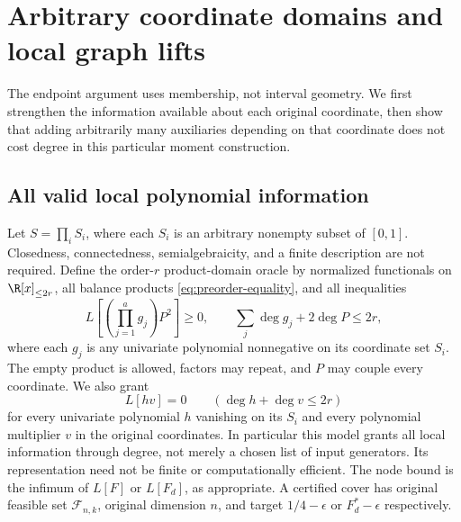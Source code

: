 \section{Arbitrary coordinate domains and local graph lifts}
\label{sec:coordinate-domains}
The endpoint argument uses membership, not interval geometry. We first
strengthen the information available about each original coordinate, then
show that adding arbitrarily many auxiliaries depending on that coordinate
does not cost degree in this particular moment construction.

\subsection{All valid local polynomial information}
Let $S=\prod_i S_i$, where each $S_i$ is an arbitrary nonempty subset of
$[0,1]$. Closedness, connectedness, semialgebraicity, and a finite description
are not required. Define the order-$r$ product-domain oracle by normalized
functionals on $\R[x]_{\le2r}$, all balance products
\eqref{eq:preorder-equality}, and all inequalities
\begin{equation}\label{eq:product-domain-oracle}
 L\left[\left(\prod_{j=1}^a g_j\right)P^2\right]\ge0,
 \qquad\sum_j\deg g_j+2\deg P\le2r,
\end{equation}
where each $g_j$ is any univariate polynomial nonnegative on its
coordinate set $S_i$. The empty product is allowed, factors may repeat,
and $P$ may couple every coordinate. We also grant
\begin{equation}\label{eq:product-domain-equalities}
 L[h v]=0\qquad(\deg h+\deg v\le2r)
\end{equation}
for every univariate polynomial $h$ vanishing on its $S_i$ and every
polynomial multiplier $v$ in the original coordinates. In particular this
model grants all local information through degree, not merely a chosen
list of input generators. Its representation need not be finite or
computationally efficient. The node bound is the infimum of $L[F]$ or
$L[F_d]$, as appropriate. A certified cover has original feasible set
$\mathcal F_{n,k}$, original dimension $n$, and target
$1/4-\epsilon$ or $F_d^*-\epsilon$ respectively.

